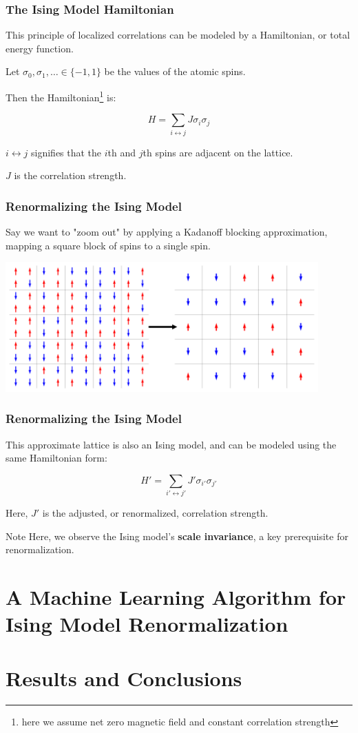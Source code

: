\documentclass[aspectratio=169, 12pt]{beamer}
\begin{document}
\begin{frame}
    \frametitle{The Ising Model Hamiltonian}

    This principle of localized correlations can be modeled by a Hamiltonian, or total energy function. 

    \vspace{1em}

    Let $\sigma_0, \sigma_1, \dots \in \{-1, 1\}$ be the values of the atomic spins. 

    Then the Hamiltonian\footnote{here we assume net zero magnetic field and constant correlation strength} is:

    \[
    H = \sum_{i \leftrightarrow j} J \sigma_i \sigma_j
    \]

    $i \leftrightarrow j$ signifies that the $i$th and $j$th spins are adjacent on the lattice. 
    
    $J$ is the correlation strength. 

\end{frame}
    
\begin{frame}

    \frametitle{Renormalizing the Ising Model}

    Say we want to "zoom out" by applying a Kadanoff blocking approximation, mapping a square block of spins to a single spin. 
    \begin{center}
        \includegraphics[width=0.9\textwidth]{images/ising-blocking.png}
    \end{center}
    
\end{frame}

\begin{frame}
    \frametitle{Renormalizing the Ising Model}

    This approximate lattice is also an Ising model, and can be modeled using the same Hamiltonian form:

    \[
    H' = \sum_{i' \leftrightarrow j'} J' \sigma_{i'} \sigma_{j'}
    \]

    Here, $J'$ is the adjusted, or renormalized, correlation strength. 

    \begin{alertblock}{Note}
        Here, we observe the Ising model's \textbf{scale invariance}, a key prerequisite for renormalization. 
    \end{alertblock}
     
\end{frame}

\section{A Machine Learning Algorithm for Ising Model Renormalization}

\section{Results and Conclusions}
\end{document}
